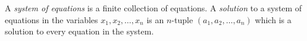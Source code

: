 \begin{definition}
    A \emph{system of equations} is a finite collection of equations. A \emph{solution} to a system of equations in the variables \(x_1,x_2, \dots, x_n\) is an \(n\)-tuple \(\left(a_1,a_2, \dots, a_n\right)\) which is a solution to every equation in the system.
\end{definition}
